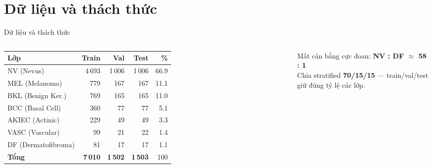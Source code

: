 \documentclass[10pt, aspectratio=169]{beamer}
\renewcommand{\framesubtitle}[1]{%
  \vspace*{-0.3em}\noindent{\large\bfseries\textcolor{usthdark}{#1}}\par\vspace{0.6em}%
}
\begin{document}
\section{Dữ liệu và thách thức}
\begin{frame}{Dữ liệu và thách thức}
    \framesubtitle{ISIC 2018 Task 3 (HAM10000) --- 10.015 ảnh dermoscopy, 7 lớp}
    \begin{columns}[T]
        \scriptsize
        \begin{table}[]
            \centering
            \begin{tabular}{lrrrr}
            \toprule
            \rowcolor{usthblue!25} \textbf{Lớp} & \textbf{Train} & \textbf{Val} & \textbf{Test} & \textbf{\%} \\
            \midrule
            NV (Nevus)          & 4\,693 & 1\,006 & 1\,006 & 66.9 \\
            MEL (Melanoma)      &   779  &  167   &  167   & 11.1 \\
            BKL (Benign Ker.)   &   769  &  165   &  165   & 11.0 \\
            BCC (Basal Cell)    &   360  &   77   &   77   &  5.1 \\
            AKIEC (Actinic)     &   229  &   49   &   49   &  3.3 \\
            VASC (Vascular)     &    99  &   21   &   22   &  1.4 \\
            DF (Dermatofibroma) &    81  &   17   &   17   &  1.1 \\
            \midrule
            \textbf{Tổng}       & \textbf{7\,010} & \textbf{1\,502} & \textbf{1\,503} & 100 \\
            \bottomrule
            \end{tabular}
        \end{table}
        \vspace{0.1cm}
        \centering
        \textcolor{usthred}{\footnotesize Mất cân bằng cực đoan: \textbf{NV : DF $\approx$ 58 : 1}} \\[3pt]
        \footnotesize Chia stratified \textbf{70/15/15} --- train/val/test giữ đúng tỷ lệ các lớp.


\end{columns}
\end{frame}
\end{document}
